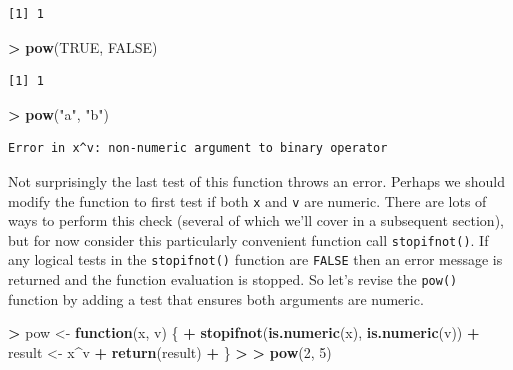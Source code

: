 \documentclass[]{krantz}
\makeatletter
\newenvironment{Shaded}{\begin{snugshade}}{\end{snugshade}}
\newcommand{\KeywordTok}[1]{\textcolor[rgb]{0.27,0.27,0.27}{\textbf{#1}}}
\newcommand{\DecValTok}[1]{\textcolor[rgb]{0.06,0.06,0.06}{#1}}
\newcommand{\StringTok}[1]{\textcolor[rgb]{0.5,0.5,0.5}{#1}}
\newcommand{\OtherTok}[1]{\textcolor[rgb]{0.37,0.37,0.37}{#1}}
\newcommand{\ControlFlowTok}[1]{\textcolor[rgb]{0.27,0.27,0.27}{\textbf{#1}}}
\newcommand{\OperatorTok}[1]{\textcolor[rgb]{0.43,0.43,0.43}{\textbf{#1}}}
\newcommand{\ErrorTok}[1]{\textcolor[rgb]{0.14,0.14,0.14}{\textbf{#1}}}
\newcommand{\NormalTok}[1]{#1}
\newenvironment{kframe}{%
\medskip{}
\setlength{\fboxsep}{.8em}
 \def\at@end@of@kframe{}%
 \ifinner\ifhmode%
  \def\at@end@of@kframe{\end{minipage}}%
  \begin{minipage}{\columnwidth}%
 \fi\fi%
 \def\FrameCommand##1{\hskip\@totalleftmargin \hskip-\fboxsep
 \colorbox{shadecolor}{##1}\hskip-\fboxsep
     \hskip-\linewidth \hskip-\@totalleftmargin \hskip\columnwidth}%
 \MakeFramed {\advance\hsize-\width
   \@totalleftmargin\z@ \linewidth\hsize
   \@setminipage}}%
 {\par\unskip\endMakeFramed%
 \at@end@of@kframe}
\renewenvironment{Shaded}{\begin{kframe}}{\end{kframe}}
\theoremstyle{definition}
\theoremstyle{definition}
\theoremstyle{definition}
\theoremstyle{remark}
\makeatother
\begin{document}
\begin{verbatim}
[1] 1
\end{verbatim}

\begin{Shaded}
\begin{Highlighting}[]
\OperatorTok{>}\StringTok{ }\KeywordTok{pow}\NormalTok{(}\OtherTok{TRUE}\NormalTok{, }\OtherTok{FALSE}\NormalTok{)}
\end{Highlighting}
\end{Shaded}

\begin{verbatim}
[1] 1
\end{verbatim}

\begin{Shaded}
\begin{Highlighting}[]
\OperatorTok{>}\StringTok{ }\KeywordTok{pow}\NormalTok{(}\StringTok{"a"}\NormalTok{, }\StringTok{"b"}\NormalTok{)}
\end{Highlighting}
\end{Shaded}

\begin{verbatim}
Error in x^v: non-numeric argument to binary operator
\end{verbatim}

Not surprisingly the last test of this function throws an error. Perhaps
we should modify the function to first test if both \texttt{x} and
\texttt{v} are numeric. There are lots of ways to perform this check
(several of which we'll cover in a subsequent section), but for now
consider this particularly convenient function call
\texttt{stopifnot()}. If any logical tests in the \texttt{stopifnot()}
function are \texttt{FALSE} then an error message is returned and the
function evaluation is stopped. So let's revise the \texttt{pow()}
function by adding a test that ensures both arguments are numeric.

\begin{Shaded}
\begin{Highlighting}[]
\OperatorTok{>}\StringTok{ }\NormalTok{pow <-}\StringTok{ }\ControlFlowTok{function}\NormalTok{(x, v) \{}
\OperatorTok{+}\StringTok{   }\KeywordTok{stopifnot}\NormalTok{(}\KeywordTok{is.numeric}\NormalTok{(x), }\KeywordTok{is.numeric}\NormalTok{(v))}
\OperatorTok{+}\StringTok{   }\NormalTok{result <-}\StringTok{ }\NormalTok{x}\OperatorTok{^}\NormalTok{v}
\OperatorTok{+}\StringTok{   }\KeywordTok{return}\NormalTok{(result)}
\OperatorTok{+}\StringTok{ }\NormalTok{\}}
\OperatorTok{>}\StringTok{ }
\ErrorTok{>}\StringTok{ }\KeywordTok{pow}\NormalTok{(}\DecValTok{2}\NormalTok{, }\DecValTok{5}\NormalTok{)}
\end{Highlighting}
\end{Shaded}
\end{document}
